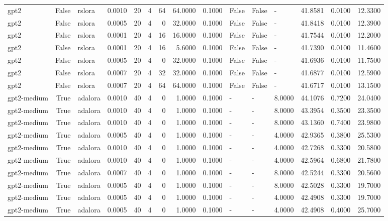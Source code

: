 \begin{tabular}{lrlrrrrrrlllrrr}
gpt2 & False & rslora & 0.0010 & 20 & 4 & 64 & 64.0000 & 0.1000 & False & False & - & 41.8581 & 0.0100 & 12.3300 \\
gpt2 & False & rslora & 0.0005 & 20 & 4 & 0 & 32.0000 & 0.1000 & False & False & - & 41.8418 & 0.0100 & 12.3900 \\
gpt2 & False & rslora & 0.0001 & 20 & 4 & 16 & 16.0000 & 0.1000 & False & False & - & 41.7544 & 0.0100 & 12.2000 \\
gpt2 & False & rslora & 0.0001 & 20 & 4 & 16 & 5.6000 & 0.1000 & False & False & - & 41.7390 & 0.0100 & 11.4600 \\
gpt2 & False & rslora & 0.0005 & 20 & 4 & 0 & 32.0000 & 0.1000 & False & False & - & 41.6936 & 0.0100 & 11.7500 \\
gpt2 & False & rslora & 0.0007 & 20 & 4 & 32 & 32.0000 & 0.1000 & False & False & - & 41.6877 & 0.0100 & 12.5900 \\
gpt2 & False & rslora & 0.0007 & 20 & 4 & 64 & 64.0000 & 0.1000 & False & False & - & 41.6717 & 0.0100 & 13.1500 \\
gpt2-medium & True & adalora & 0.0010 & 40 & 4 & 0 & 1.0000 & 0.1000 & - & - & 8.0000 & 44.1076 & 0.7200 & 24.0400 \\
gpt2-medium & True & adalora & 0.0010 & 40 & 4 & 0 & 1.0000 & 0.1000 & - & - & 8.0000 & 43.3954 & 0.3500 & 23.3500 \\
gpt2-medium & True & adalora & 0.0010 & 40 & 4 & 0 & 1.0000 & 0.1000 & - & - & 8.0000 & 43.1360 & 0.7400 & 23.9800 \\
gpt2-medium & True & adalora & 0.0005 & 40 & 4 & 0 & 1.0000 & 0.1000 & - & - & 4.0000 & 42.9365 & 0.3800 & 25.5300 \\
gpt2-medium & True & adalora & 0.0010 & 40 & 4 & 0 & 1.0000 & 0.1000 & - & - & 4.0000 & 42.7268 & 0.3300 & 20.5800 \\
gpt2-medium & True & adalora & 0.0010 & 40 & 4 & 0 & 1.0000 & 0.1000 & - & - & 4.0000 & 42.5964 & 0.6800 & 21.7800 \\
gpt2-medium & True & adalora & 0.0007 & 40 & 4 & 0 & 1.0000 & 0.1000 & - & - & 8.0000 & 42.5244 & 0.3300 & 20.5600 \\
gpt2-medium & True & adalora & 0.0005 & 40 & 4 & 0 & 1.0000 & 0.1000 & - & - & 8.0000 & 42.5028 & 0.3300 & 19.7000 \\
gpt2-medium & True & adalora & 0.0005 & 40 & 4 & 0 & 1.0000 & 0.1000 & - & - & 4.0000 & 42.4908 & 0.3300 & 19.7000 \\
gpt2-medium & True & adalora & 0.0005 & 40 & 4 & 0 & 1.0000 & 0.1000 & - & - & 4.0000 & 42.4908 & 0.4000 & 25.7000 \\

\end{tabular}
